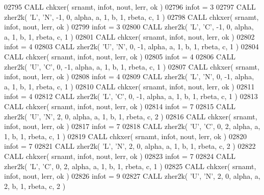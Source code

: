 \begin{DoxyCode}
02795       \textcolor{keyword}{CALL }chkxer( srnamt, infot, nout, lerr, ok )
02796       infot = 3
02797       \textcolor{keyword}{CALL }zher2k( \textcolor{stringliteral}{'L'}, \textcolor{stringliteral}{'N'}, -1, 0, alpha, a, 1, b, 1, rbeta, c, 1 )
02798       \textcolor{keyword}{CALL }chkxer( srnamt, infot, nout, lerr, ok )
02799       infot = 3
02800       \textcolor{keyword}{CALL }zher2k( \textcolor{stringliteral}{'L'}, \textcolor{stringliteral}{'C'}, -1, 0, alpha, a, 1, b, 1, rbeta, c, 1 )
02801       \textcolor{keyword}{CALL }chkxer( srnamt, infot, nout, lerr, ok )
02802       infot = 4
02803       \textcolor{keyword}{CALL }zher2k( \textcolor{stringliteral}{'U'}, \textcolor{stringliteral}{'N'}, 0, -1, alpha, a, 1, b, 1, rbeta, c, 1 )
02804       \textcolor{keyword}{CALL }chkxer( srnamt, infot, nout, lerr, ok )
02805       infot = 4
02806       \textcolor{keyword}{CALL }zher2k( \textcolor{stringliteral}{'U'}, \textcolor{stringliteral}{'C'}, 0, -1, alpha, a, 1, b, 1, rbeta, c, 1 )
02807       \textcolor{keyword}{CALL }chkxer( srnamt, infot, nout, lerr, ok )
02808       infot = 4
02809       \textcolor{keyword}{CALL }zher2k( \textcolor{stringliteral}{'L'}, \textcolor{stringliteral}{'N'}, 0, -1, alpha, a, 1, b, 1, rbeta, c, 1 )
02810       \textcolor{keyword}{CALL }chkxer( srnamt, infot, nout, lerr, ok )
02811       infot = 4
02812       \textcolor{keyword}{CALL }zher2k( \textcolor{stringliteral}{'L'}, \textcolor{stringliteral}{'C'}, 0, -1, alpha, a, 1, b, 1, rbeta, c, 1 )
02813       \textcolor{keyword}{CALL }chkxer( srnamt, infot, nout, lerr, ok )
02814       infot = 7
02815       \textcolor{keyword}{CALL }zher2k( \textcolor{stringliteral}{'U'}, \textcolor{stringliteral}{'N'}, 2, 0, alpha, a, 1, b, 1, rbeta, c, 2 )
02816       \textcolor{keyword}{CALL }chkxer( srnamt, infot, nout, lerr, ok )
02817       infot = 7
02818       \textcolor{keyword}{CALL }zher2k( \textcolor{stringliteral}{'U'}, \textcolor{stringliteral}{'C'}, 0, 2, alpha, a, 1, b, 1, rbeta, c, 1 )
02819       \textcolor{keyword}{CALL }chkxer( srnamt, infot, nout, lerr, ok )
02820       infot = 7
02821       \textcolor{keyword}{CALL }zher2k( \textcolor{stringliteral}{'L'}, \textcolor{stringliteral}{'N'}, 2, 0, alpha, a, 1, b, 1, rbeta, c, 2 )
02822       \textcolor{keyword}{CALL }chkxer( srnamt, infot, nout, lerr, ok )
02823       infot = 7
02824       \textcolor{keyword}{CALL }zher2k( \textcolor{stringliteral}{'L'}, \textcolor{stringliteral}{'C'}, 0, 2, alpha, a, 1, b, 1, rbeta, c, 1 )
02825       \textcolor{keyword}{CALL }chkxer( srnamt, infot, nout, lerr, ok )
02826       infot = 9
02827       \textcolor{keyword}{CALL }zher2k( \textcolor{stringliteral}{'U'}, \textcolor{stringliteral}{'N'}, 2, 0, alpha, a, 2, b, 1, rbeta, c, 2 )

\end{DoxyCode}
